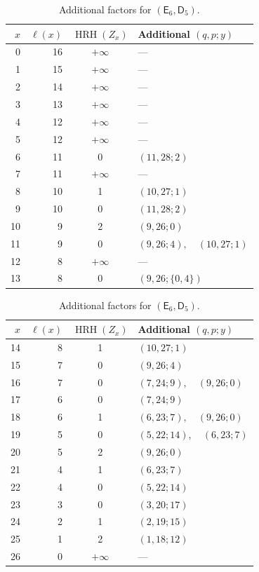 \documentclass[12pt]{amsart}
\theoremstyle{definition}
\numberwithin{equation}{section}
\begin{document}
\begin{table}[!htbp]
\begin{minipage}{\textwidth}
\centering
\caption{Additional factors for $(\mathsf E_6,\mathsf D_5)$.}
\label{tab:exceptional-e6}
\medskip
{\small
\setlength{\tabcolsep}{3pt}
\begin{minipage}[t]{0.49\textwidth}
\vspace{0pt}\centering
\begin{tabular}{@{}rrcl@{}}
\hline
$x$ & $\ell(x)$ & $\operatorname{HRH}(Z_x)$ & Additional $(q,p;y)$\\
\hline
0 & 16 & $+\infty$ & ---\\
1 & 15 & $+\infty$ & ---\\
2 & 14 & $+\infty$ & ---\\
3 & 13 & $+\infty$ & ---\\
4 & 12 & $+\infty$ & ---\\
5 & 12 & $+\infty$ & ---\\
6 & 11 & 0 & $(11,28;2)$\\
7 & 11 & $+\infty$ & ---\\
8 & 10 & 1 & $(10,27;1)$\\
9 & 10 & 0 & $(11,28;2)$\\
10 & 9 & 2 & $(9,26;0)$\\
11 & 9 & 0 & $(9,26;4),\quad (10,27;1)$\\
12 & 8 & $+\infty$ & ---\\
13 & 8 & 0 & $(9,26;\{0,4\})$\\
\hline
\end{tabular}
\end{minipage}\hfill
\begin{minipage}[t]{0.49\textwidth}
\vspace{0pt}\centering
\begin{tabular}{@{}rrcl@{}}
\hline
$x$ & $\ell(x)$ & $\operatorname{HRH}(Z_x)$ & Additional $(q,p;y)$\\
\hline
14 & 8 & 1 & $(10,27;1)$\\
15 & 7 & 0 & $(9,26;4)$\\
16 & 7 & 0 & $(7,24;9),\quad (9,26;0)$\\
17 & 6 & 0 & $(7,24;9)$\\
18 & 6 & 1 & $(6,23;7),\quad (9,26;0)$\\
19 & 5 & 0 & $(5,22;14),\quad (6,23;7)$\\
20 & 5 & 2 & $(9,26;0)$\\
21 & 4 & 1 & $(6,23;7)$\\
22 & 4 & 0 & $(5,22;14)$\\
23 & 3 & 0 & $(3,20;17)$\\
24 & 2 & 1 & $(2,19;15)$\\
25 & 1 & 2 & $(1,18;12)$\\
26 & 0 & $+\infty$ & ---\\
\hline
\end{tabular}
\end{minipage}
\par}
\end{minipage}
\end{table}
\end{document}
